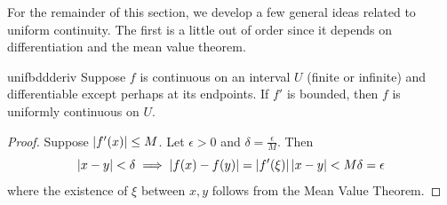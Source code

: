 % 
 	

For the remainder of this section, we develop a few general ideas related to uniform continuity. The first is a little out of order since it depends on differentiation and the mean value theorem.

\begin{thm}{}{unifbddderiv}
	Suppose $f$ is continuous on an interval $U$ (finite or infinite) and differentiable except perhaps at its endpoints. If $f'$ is bounded, then $f$ is uniformly continuous on $U$.
\end{thm}

\begin{proof}
	Suppose $\left| f'(x)\right|\le M$. Let $\epsilon>0$ and $\delta=\frac\epsilon M$. 
	Then
	\[\left| x-y\right|<\delta\implies \left| f(x)-f(y)\right|=\left| f'(\xi)\right|\left| x-y\right|<M\delta=\epsilon\]
	where the existence of $\xi$ between $x,y$ follows from the Mean Value Theorem.\footnotemark{}
\end{proof}


